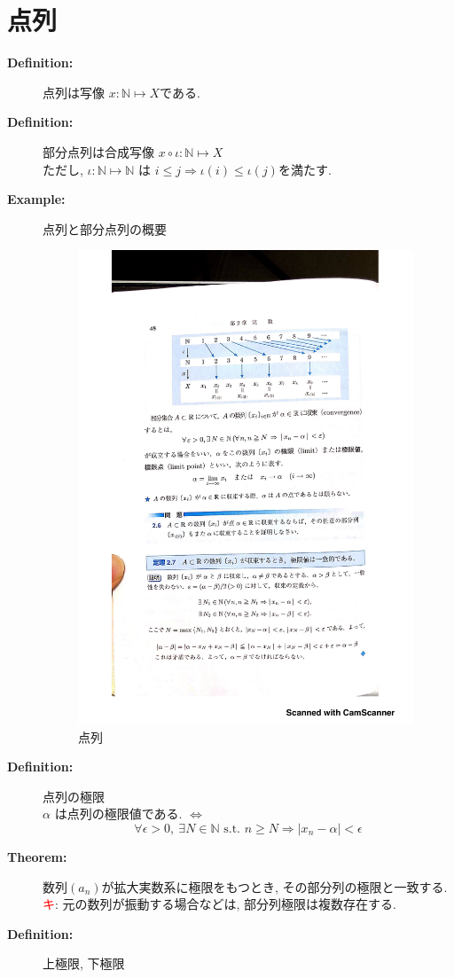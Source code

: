\documentclass[english,dvipdfmx]{jsarticle}
\newcommand*{\point}{\textcircled{\textcolor{red}{\scriptsize キ}}}
\begin{document}
\section{点列}
    \begin{description}
        \item[\bf{Definition:}] 点列は写像 $ x : \mathbb{N} \longmapsto X $である.
        \item[\bf{Definition:}] 部分点列は合成写像 $ x \circ \iota : \mathbb{N} \longmapsto X$ \\
        ただし, $\iota : \mathbb{N} \longmapsto \mathbb{N} $ は $ i \leq j \Rightarrow \iota(i) \leq \iota(j) $を満たす.
        \item[\bf{Example:}] 点列と部分点列の概要
            \begin{figure}[H]
                \begin{center}
                \includegraphics[clip,width=10cm]{./sequence.pdf}
                \caption{点列}
                \end{center}
            \end{figure}
        \item[\bf{Definition:}] 点列の極限 \\
            $\alpha$ は点列の極限値である. $\Leftrightarrow$
            \begin{equation*}
                \forall \epsilon > 0 ,\ \exists N \in \mathbb{N} \text{ s.t. } n \geq N \Rightarrow | x_n - \alpha | < \epsilon
            \end{equation*}
        \item[\bf{Theorem:}] 数列$(a_n)$が拡大実数系に極限をもつとき, その部分列の極限と一致する. \\
            \point : 元の数列が振動する場合などは, 部分列極限は複数存在する.
        \item[\bf{Definition:}] 上極限, 下極限 \\
            

\end{description}
\end{document}
